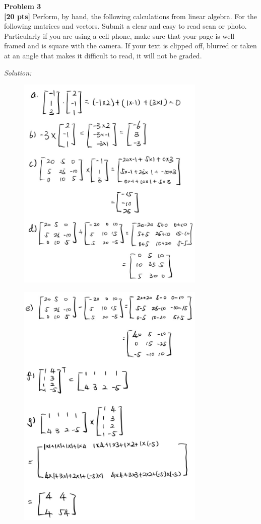 \documentclass{article}
\newenvironment{problem}[2][Problem]
    { \begin{mdframed}[backgroundcolor=gray!20] \textbf{#1 #2} \\}
    {  \end{mdframed}}
\newenvironment{solution}
    {\textit{Solution:}}
    {}
\begin{document}
\newpage
\begin{problem}{3}
\textbf{[20 pts]}
Perform, by hand, the following calculations from linear algebra. For the following matrices and vectors. Submit a clear and easy to read scan or photo. Particularly if you are using a cell phone, make sure that your page is well framed and is square with the camera. If your text is clipped off, blurred or taken at an angle that makes it difficult to read, it will not be graded.
\end{problem}
\begin{solution}
	\begin{figure}[h]
		\centering
		\includegraphics[width=0.8\textwidth]{p3_a.jpg}
	\end{figure}
\newpage
	\begin{figure}[h]
		\centering
		\includegraphics[width=0.8\textwidth]{p3_b.jpg}

\end{figure}
\end{solution}
\end{document}
